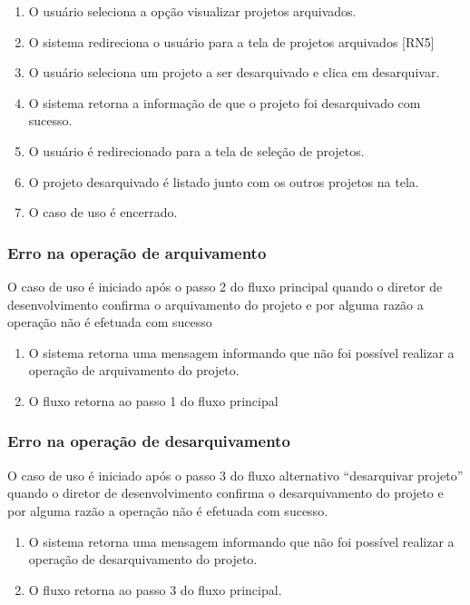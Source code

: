 \begin{enumerate}
  \item O usuário seleciona a opção visualizar projetos arquivados.
  \item O sistema redireciona o usuário para a tela de projetos arquivados [RN5]
  \item O usuário seleciona um projeto a ser desarquivado e clica em desarquivar.
  \item O sistema retorna a informação de que o projeto foi desarquivado com sucesso.
  \item O usuário é redirecionado para a tela de seleção de projetos.
  \item O projeto desarquivado é listado junto com os outros projetos na tela.
  \item O caso de uso é encerrado.
\end{enumerate}

\subsubsection{Erro na operação de arquivamento}
O caso de uso é iniciado após o passo 2 do fluxo principal quando o diretor de desenvolvimento confirma o arquivamento do projeto e por alguma razão a operação não é efetuada com sucesso

\begin{enumerate}
  \item O sistema retorna uma mensagem informando que não foi possível realizar a operação de arquivamento do projeto.
  \item O fluxo retorna ao passo 1 do fluxo principal 
\end{enumerate}

\subsubsection{Erro na operação de desarquivamento}
O caso de uso é iniciado após o passo 3 do fluxo alternativo “desarquivar projeto” quando o diretor de desenvolvimento confirma o desarquivamento do projeto e por alguma razão a operação não é efetuada com sucesso.

\begin{enumerate}
  \item O sistema retorna uma mensagem informando que não foi possível realizar a operação de desarquivamento do projeto.
  \item O fluxo retorna ao passo 3 do fluxo principal.
\end{enumerate}


